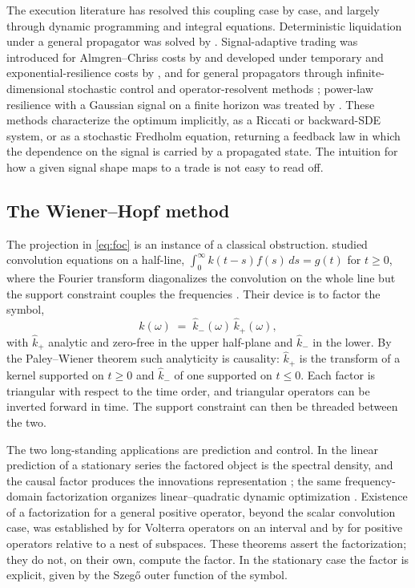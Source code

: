 \documentclass[11pt]{article}
\theoremstyle{plain}
\theoremstyle{definition}
\theoremstyle{remark}
\begin{document}
The execution literature has resolved this coupling case by case, and largely through dynamic programming and integral equations. Deterministic liquidation under a general propagator was solved by \citet{GatheralSchiedSlynko2012}. Signal-adaptive trading was introduced for Almgren--Chriss costs by \citet{CarteaJaimungal2013} and developed under temporary and exponential-resilience costs by \citet{LehalleNeuman2019,NeumanVoss2022,BankSonerVoss2017}, and for general propagators through infinite-dimensional stochastic control and operator-resolvent methods \citep{AbiJaberNeuman2025,AbiJaberNeumanTuschmann2024,AbiJaberDeCarvalhoPham2024}; power-law resilience with a Gaussian signal on a finite horizon was treated by \citet{FordeSanchezSmith2022}. These methods characterize the optimum implicitly, as a Riccati or backward-SDE system, or as a stochastic Fredholm equation, returning a feedback law in which the dependence on the signal is carried by a propagated state. The intuition for how a given signal shape maps to a trade is not easy to read off.

\subsection{The Wiener--Hopf method}\label{sec:wh}

The projection in \eqref{eq:foc} is an instance of a classical obstruction. \citet{WienerHopf1931} studied convolution equations on a half-line, $\int_0^\infty k(t-s)f(s)\,ds=g(t)$ for $t\ge0$, where the Fourier transform diagonalizes the convolution on the whole line but the support constraint couples the frequencies \citep{Krein1962,Noble1958}. Their device is to factor the symbol,
\[
\hat k(\omega) \;=\; \hat k_-(\omega)\,\hat k_+(\omega),
\]
with $\hat k_+$ analytic and zero-free in the upper half-plane and $\hat k_-$ in the lower. By the Paley--Wiener theorem such analyticity is causality: $\hat k_+$ is the transform of a kernel supported on $t\ge0$ and $\hat k_-$ of one supported on $t\le0$. Each factor is triangular with respect to the time order, and triangular operators can be inverted forward in time. The support constraint can then be threaded between the two.

The two long-standing applications are prediction and control. In the linear prediction of a stationary series the factored object is the spectral density, and the causal factor produces the innovations representation \citep{Wiener1949,Whittle1963}; the same frequency-domain factorization organizes linear--quadratic dynamic optimization \citep{Whiteman1985}. Existence of a factorization for a general positive operator, beyond the scalar convolution case, was established by \citet{GohbergKrein1970} for Volterra operators on an interval and by \citet{Arveson1975} for positive operators relative to a nest of subspaces. These theorems assert the factorization; they do not, on their own, compute the factor. In the stationary case the factor is explicit, given by the Szeg\H{o} outer function of the symbol.
\end{document}
